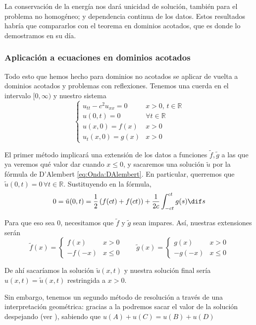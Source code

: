 		La conservación de la energía nos dará unicidad de solución, también para el problema no homogéneo; y dependencia continua de los datos. Estos resultados habría que compararlos con el teorema en dominios acotados, que es donde lo demostramos en su día.

		\clearpage %
		\subsubsection{Aplicación a ecuaciones en dominios acotados}

		Todo esto que hemos hecho para dominios no acotados se aplicar de vuelta a dominios acotados y problemas con reflexiones. Tenemos una cuerda en el intervalo $[0, ∞)$ y nuestro sistema \[ \begin{cases}
		u_{tt} - c^2u_{xx} = 0 & x > 0,\, t ∈ ℝ \\
		u(0,t) = 0 & ∀ t ∈ ℝ \\
		u(x,0) = f(x) & x > 0 \\
		u_t(x,0) = g(x) & x > 0
		\end{cases}\]

		El primer método implicará una extensión de los datos a funciones $\tilde{f}, \tilde{g}$ a las que ya veremos qué valor dar cuando $x ≤ 0$, y sacaremos una solución $\tilde{u}$ por la fórmula de D'Alembert \eqref{eq:Onda:DAlembert}. En particular, querremos que $\tilde{u}(0,t) = 0\,∀t ∈ ℝ$. Sustituyendo en la fórmula, \[ 0 = \tilde{u}(0,t) = \frac{1}{2} \left(f(ct) + f(ct)\right) + \frac{1}{2c} \int_{-ct}^{ct} g(s) \dif s \]

		Para que eso sea 0, necesitamos que $\tilde{f}$ y $\tilde{g}$ sean impares. Así, nuestras extensiones serán \[
		\tilde{f}(x) = \begin{cases}
		f(x) & x > 0 \\
		-f(-x) & x ≤ 0
		\end{cases} \qquad
		\tilde{g}(x) = \begin{cases}
		g(x) & x > 0 \\
		-g(-x) & x ≤ 0
		\end{cases}
		\]

		De ahí sacaríamos la solución $\tilde{u}(x,t)$ y nuestra solución final sería $u(x,t) = \tilde{u}(x,t)$ restringida a $x > 0$.

		Sin embargo, tenemos un segundo método de resolución a través de una interpretación geométrica: gracias a la  podremos sacar el valor de la solución despejando (ver ), sabiendo que \( u(A) + u(C) = u(B) + u(D) \label{eq:Onda:Paralelogramo} \)

